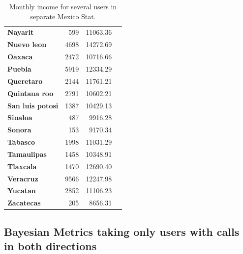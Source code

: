 \begin{table}[p]
\begin{tabular}{>{\bfseries}l r r c}
Nayarit & \num{599} & \num{11063.36} & \\
Nuevo leon & \num{4698} & \num{14272.69} & \\
Oaxaca & \num{2472} & \num{10716.66} & \\
Puebla & \num{5919} & \num{12334.29} & \\
Queretaro & \num{2144} & \num{11761.21} & \\
Quintana roo & \num{2791} & \num{10602.21} & \\
San luis potosi & \num{1387} & \num{10429.13} & \\
Sinaloa & \num{487} & \num{9916.28} & \\
Sonora & \num{153} & \num{9170.34} & \\
Tabasco & \num{1998} & \num{11031.29} & \\
Tamaulipas & \num{1458} & \num{10348.91} & \\
Tlaxcala & \num{1470} & \num{12690.40} & \\
Veracruz & \num{9566} & \num{12247.98} & \\
Yucatan & \num{2852} & \num{11106.23} & \\
Zacatecas & \num{205} & \num{8656.31} & \\
\bottomrule
\end{tabular}
\caption{Monthly income for several users in separate Mexico Stat.}
\label{tab:regions}
\end{table}

\subsection{Bayesian Metrics taking only users with calls in both directions}
\setcounter{topnumber}{8}
\setcounter{bottomnumber}{8}
\setcounter{totalnumber}{8}


